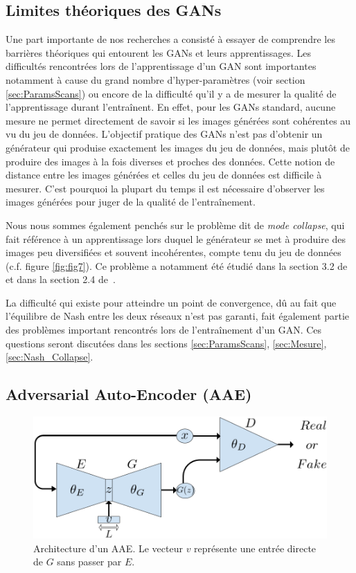 \documentclass[11pt,francais]{article}
\begin{document}
\subsection{Limites théoriques des GANs}
\label{sec:CompEtLimites}
Une part importante de nos recherches a consisté à essayer de comprendre les barrières théoriques qui entourent les GANs et leurs apprentissages. Les difficultés rencontrées lors de l'apprentissage d'un GAN sont importantes notamment à cause du grand nombre d'hyper-paramètres (voir section \ref{sec:ParamsScans}) ou encore de la difficulté qu'il y a de mesurer la qualité de l'apprentissage durant l'entraînent. 
En effet, pour les GANs standard, aucune mesure ne permet directement de savoir si les images générées sont cohérentes au vu du jeu de données. L'objectif pratique des GANs n'est pas d'obtenir un générateur qui produise exactement les images du jeu de données, mais plutôt de produire des images à la fois diverses et proches des données. Cette notion de distance entre les images générées et celles du jeu de données est difficile à mesurer. C'est pourquoi la plupart du temps il est nécessaire d'observer les images générées pour juger de la qualité de l'entraînement.

Nous nous sommes également penchés sur le problème dit de \textit{mode collapse}, qui fait référence à un apprentissage lors duquel le générateur se met à produire des images peu diversifiées et souvent incohérentes, compte tenu du jeu de données (c.f. figure \ref{fig:fig7}). Ce problème a notamment été  étudié dans la section 3.2 de~\cite{salimans2016improved} et dans la section 2.4 de~\cite{DBLP:journals/corr/MetzPPS16}.

La difficulté qui existe pour atteindre un point de convergence, dû au fait que l'équilibre de Nash entre les deux réseaux n'est pas garanti, fait également partie des problèmes important rencontrés lors de l'entraînement d'un GAN.
Ces questions seront discutées dans les sections  \ref{sec:ParamsScans}, \ref{sec:Mesure}, \ref{sec:Nash_Collapse}.

\newpage
\subsection{Adversarial Auto-Encoder (AAE)}
\label{sec:AAE}

\begin{figure}[h!]
    \centering
    \includegraphics[width=\textwidth]{Figures/GAN/AAE_representation.png}
    \caption{Architecture d'un AAE. Le vecteur \(v\) représente une entrée directe de \(G\) sans passer par \(E\).}
    \label{fig:fig10}
\end{figure}
\end{document}
